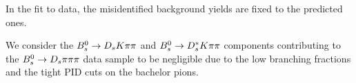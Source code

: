 In the fit to data, the misidentified background yields are fixed to the predicted ones.

We consider the ${{B}^0_{s}}\rightarrow D_s K{\pi}{\pi}$ and ${{B}^0_{s}}\rightarrow D_s^{*}K{\pi}{\pi}$ components contributing to the ${{B}^0_{s}}\rightarrow D_s \pi{\ensuremath{\pi}}{\ensuremath{\pi}}$ data sample to be negligible 
due to the low branching fractions and the tight PID cuts on the bachelor pions.

